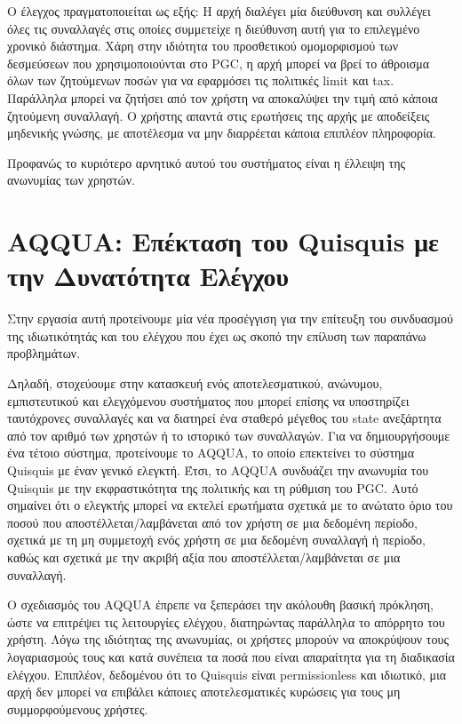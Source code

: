 Ο έλεγχος πραγματοποιείται ως εξής: Η αρχή διαλέγει μία διεύθυνση και συλλέγει όλες τις συναλλαγές στις οποίες συμμετείχε η διεύθυνση αυτή για το επιλεγμένο χρονικό διάστημα. Χάρη στην ιδιότητα του προσθετικού ομομορφισμού των δεσμεύσεων που χρησιμοποιούνται στο PGC, η αρχή μπορεί να βρεί το άθροισμα όλων των ζητούμενων ποσών για να εφαρμόσει τις πολιτικές limit και tax. Παράλληλα μπορεί να ζητήσει από τον χρήστη να αποκαλύψει την τιμή από κάποια ζητούμενη συναλλαγή. Ο χρήστης απαντά στις ερωτήσεις της αρχής με αποδείξεις μηδενικής γνώσης, με αποτέλεσμα να μην διαρρέεται κάποια επιπλέον πληροφορία.

Προφανώς το κυριότερο αρνητικό αυτού του συστήματος είναι η έλλειψη της ανωνυμίας των χρηστών.

\section{AQQUA: Επέκταση του Quisquis με την Δυνατότητα Ελέγχου}

Στην εργασία αυτή προτείνουμε μία νέα προσέγγιση για την επίτευξη του συνδυασμού της ιδιωτικότητάς και του ελέγχου που έχει ως σκοπό την επίλυση των παραπάνω προβλημάτων.

Δηλαδή, στοχεύουμε στην κατασκευή ενός αποτελεσματικού, ανώνυμου, εμπιστευτικού και ελεγχόμενου συστήματος που μπορεί επίσης να υποστηρίζει ταυτόχρονες συναλλαγές και να διατηρεί ένα σταθερό μέγεθος του state ανεξάρτητα από τον αριθμό των χρηστών ή το ιστορικό των συναλλαγών. Για να δημιουργήσουμε ένα τέτοιο σύστημα, προτείνουμε το AQQUA, το οποίο επεκτείνει το σύστημα Quisquis με έναν γενικό ελεγκτή. Έτσι, το AQQUA συνδυάζει την ανωνυμία του Quisquis με την εκφραστικότητα της πολιτικής και τη ρύθμιση του PGC. Αυτό σημαίνει ότι ο ελεγκτής μπορεί να εκτελεί ερωτήματα σχετικά με το ανώτατο όριο του ποσού που αποστέλλεται/λαμβάνεται από τον χρήστη σε μια δεδομένη περίοδο, σχετικά με τη μη συμμετοχή ενός χρήστη σε μια δεδομένη συναλλαγή ή περίοδο, καθώς και σχετικά με την ακριβή αξία που αποστέλλεται/λαμβάνεται σε μια συναλλαγή.

Ο σχεδιασμός του AQQUA έπρεπε να ξεπεράσει την ακόλουθη βασική πρόκληση, ώστε να επιτρέψει τις λειτουργίες ελέγχου, διατηρώντας παράλληλα το απόρρητο του χρήστη. Λόγω της ιδιότητας της ανωνυμίας, οι χρήστες μπορούν να αποκρύψουν τους λογαριασμούς τους και κατά συνέπεια τα ποσά που είναι απαραίτητα για τη διαδικασία ελέγχου. Επιπλέον, δεδομένου ότι το Quisquis είναι permissionless και ιδιωτικό, μια αρχή δεν μπορεί να επιβάλει κάποιες αποτελεσματικές κυρώσεις για τους μη συμμορφούμενους χρήστες.

